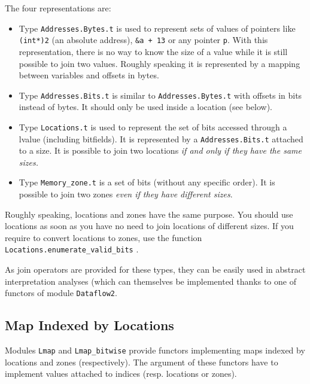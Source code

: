 The four representations are:
\begin{itemize}
\item Type \texttt{Addresses.Bytes.t}
  is used to represent sets of values of \C pointers like \texttt{(int*)2}
  (an absolute address), \texttt{\&a + 13} or any pointer \texttt{p}. With
  this representation, there is no way to know the size of a value while it
  is still possible to join two values. Roughly speaking it is
  represented by a mapping between \C variables and offsets in bytes.
\item Type \texttt{Addresses.Bits.t} is
  similar to \texttt{Addresses.Bytes.t} with offsets in bits instead of
  bytes. It should only be used inside a location (see below).
\item Type \texttt{Locations.t} is used to represent
  the set of bits accessed through a \C lvalue (including bitfields). It is
  represented by a \texttt{Addresses.Bits.t} attached to a size. It is possible
  to join two locations \emph{if and only if they have the same sizes.}
\item Type \texttt{Memory\_zone.t} is a set of bits (without
  any specific order). It is possible to join two zones \emph{even if they have
    different sizes}.
\end{itemize}

\begin{convention}
  Roughly speaking, locations and zones have the same purpose. You should use
  locations as soon as you have no need to join locations of different sizes.
  If you require to convert locations to zones, use the function
  \texttt{Locations.enumerate\_valid\_bits}%
  .
\end{convention}

As join operators are provided for these types, they can be easily used in
abstract interpretation analyses (which can
themselves be implemented thanks to one of functors of module
\texttt{Dataflow2}.

\subsection{Map Indexed by Locations}\label{memory:map}

Modules \texttt{Lmap} and
\texttt{Lmap\_bitwise} provide functors implementing
maps indexed by locations and zones (respectively). The argument of these
functors have to implement values attached to indices (resp. locations or zones).

